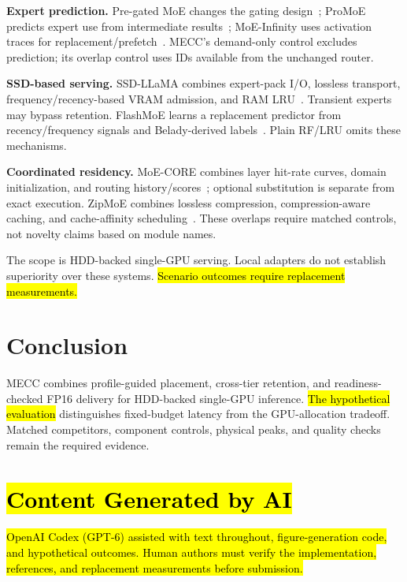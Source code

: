 \documentclass[conference,9pt,letterpaper]{IEEEtran}
\newcommand{\draftnote}[1]{{\sethlcolor{DraftYellow}\hl{#1}}}
\newcommand{\ainote}[1]{{\sethlcolor{AIBlue}\hl{#1}}}
\newcommand{\mecc}{\textsc{MECC}}
\begin{document}
\textbf{Expert prediction.} Pre-gated MoE changes the gating design~\cite{pregated}; ProMoE predicts expert use from intermediate results~\cite{promoe}; MoE-Infinity uses activation traces for replacement/prefetch~\cite{moeinfinity}. MECC's demand-only control excludes prediction; its overlap control uses IDs available from the unchanged router.

\textbf{SSD-based serving.} SSD-LLaMA combines expert-pack I/O, lossless transport, frequency/recency-based VRAM admission, and RAM LRU~\cite{ssdllama}. Transient experts may bypass retention. FlashMoE learns a replacement predictor from recency/frequency signals and Belady-derived labels~\cite{flashmoe}. Plain RF/LRU omits these mechanisms.

\textbf{Coordinated residency.} MoE-CORE combines layer hit-rate curves, domain initialization, and routing history/scores~\cite{core}; optional substitution is separate from exact execution. ZipMoE combines lossless compression, compression-aware caching, and cache-affinity scheduling~\cite{zipmoe}. These overlaps require matched controls, not novelty claims based on module names.

The scope is HDD-backed single-GPU serving. Local adapters do not establish superiority over these systems. \draftnote{Scenario outcomes require replacement measurements.}

\section{Conclusion}
\mecc{} combines profile-guided placement, cross-tier retention, and readiness-checked FP16 delivery for HDD-backed single-GPU inference. \draftnote{The hypothetical evaluation} distinguishes fixed-budget latency from the GPU-allocation tradeoff. Matched competitors, component controls, physical peaks, and quality checks remain the required evidence.

\section*{\ainote{Content Generated by AI}}
\ainote{OpenAI Codex (GPT-6) assisted with text throughout, figure-generation code, and hypothetical outcomes. Human authors must verify the implementation, references, and replacement measurements before submission.}

\clearpage
\nobalance
{}


\end{document}
